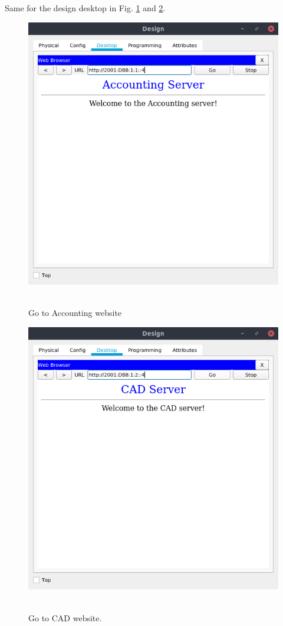\documentclass[conference]{IEEEtran}
\begin{document}
Same for the design desktop in Fig. \ref{browser_design1} and \ref{browser_design2}.

\begin{center}
\begin{figure}[h]
\includegraphics[scale=0.45]{resources/q43.png}\
\caption{Go to Accounting website}
\label{browser_design1}
\end{figure}
\end{center}

\begin{center}
\begin{figure}[h]
\includegraphics[scale=0.45]{resources/q44.png}\
\caption{Go to CAD website.}
\label{browser_design2}
\end{figure}
\end{center}
\end{document}

